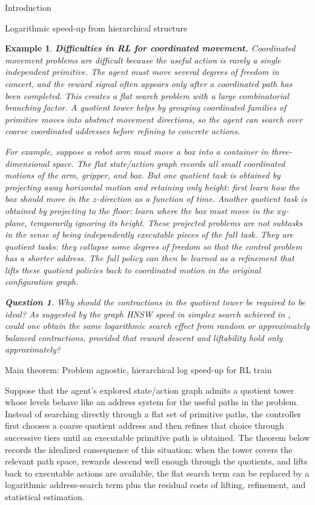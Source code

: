 \documentclass[11pt]{article}
\newtheorem{example}[subsubsection]{Example}
\newtheorem{question}[]{Question}
\begin{document}
\begin{section}{Introduction}
\begin{subsection}{Logarithmic speed-up from hierarchical structure}
\begin{example}
{\bf Difficulties in RL for coordinated movement.}
\normalfont
Coordinated movement problems are difficult because the useful action is rarely a single independent primitive. The agent must move several degrees of freedom in concert, and the reward signal often appears only after a coordinated path has been completed. This creates a flat search problem with a large combinatorial branching factor. A quotient tower helps by grouping coordinated families of primitive moves into abstract movement directions, so the agent can search over coarse coordinated addresses before refining to concrete actions.

For example, suppose a robot arm must move a box into a container in three-dimensional space. The flat state/action graph records all small coordinated motions of the arm, gripper, and box. But one quotient task is obtained by projecting away horizontal motion and retaining only height: first learn how the box should move in the $z$-direction as a function of time. Another quotient task is obtained by projecting to the floor: learn where the box must move in the $xy$-plane, temporarily ignoring its height. These projected problems are not subtasks in the sense of being independently executable pieces of the full task. They are quotient tasks: they collapse some degrees of freedom so that the control problem has a shorter address. The full policy can then be learned as a refinement that lifts these quotient policies back to coordinated motion in the original configuration graph.

\begin{question}
Why should the contractions in the quotient tower be required to be ideal?  As suggested by the graph HNSW speed in simplex search achieved in \cite{MalikThesis}, could one obtain the same logarithmic search effect from random or approximately balanced contractions, provided that reward descent and liftability hold only approximately?
\end{question}
\end{example}


\end{subsection}

\begin{subsection}{Main theorem: Problem agnostic, hierarchical log speed-up for RL train}

Suppose that the agent's explored state/action graph admits a quotient tower whose levels behave like an address system for the useful paths in the problem. Instead of searching directly through a flat set of primitive paths, the controller first chooses a coarse quotient address and then refines that choice through successive tiers until an executable primitive path is obtained. The theorem below records the idealized consequence of this situation: when the tower covers the relevant path space, rewards descend well enough through the quotients, and lifts back to executable actions are available, the flat search term can be replaced by a logarithmic address-search term plus the residual costs of lifting, refinement, and statistical estimation.


\end{subsection}
\end{section}
\end{document}
